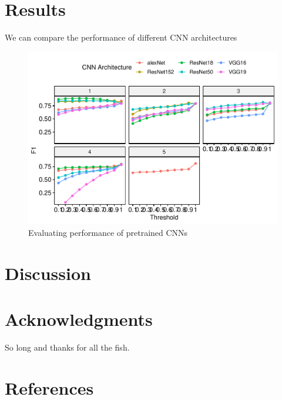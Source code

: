 \documentclass{article}
\begin{document}
\hypertarget{results}{%
\section{Results}\label{results}}

We can compare the performance of different CNN architectures

\begin{figure}[h]

\includegraphics{gibbonNetR-MS-format_files/figure-latex/unnamed-chunk-2-1} \hfill{}

\caption{Evaluating performance of pretrained CNNs}\label{fig:unnamed-chunk-2}
\end{figure}

\hypertarget{discussion}{%
\section{Discussion}\label{discussion}}

\hypertarget{acknowledgments}{%
\section{Acknowledgments}\label{acknowledgments}}

So long and thanks for all the fish.

\hypertarget{references}{%
\section*{References}\label{references}}
\end{document}
